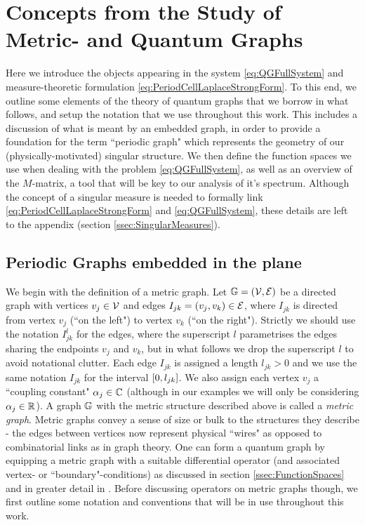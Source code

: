 \section{Concepts from the Study of Metric- and Quantum Graphs} \label{sec:QuantumGraphs}
Here we introduce the objects appearing in the system \eqref{eq:QGFullSystem} and measure-theoretic formulation \eqref{eq:PeriodCellLaplaceStrongForm}.
To this end, we outline some elements of the theory of quantum graphs that we borrow in what follows, and setup the notation that we use throughout this work.
This includes a discussion of what is meant by an embedded graph, in order to provide a foundation for the term ``periodic graph" which represents the geometry of our (physically-motivated) singular structure.
We then define the function spaces we use when dealing with the problem \eqref{eq:QGFullSystem}, as well as an overview of the $M$-matrix, a tool that will be key to our analysis of it's spectrum.
Although the concept of a singular measure is needed to formally link \eqref{eq:PeriodCellLaplaceStrongForm} and \eqref{eq:QGFullSystem}, these details are left to the appendix (section \ref{ssec:SingularMeasures}).

\subsection{Periodic Graphs embedded in the plane} \label{ssec:EmbeddedGraphs}
We begin with the definition of a metric graph.
Let $\mathbb{G}=\left( \mathcal{V},\mathcal{E} \right)$ be a directed graph with vertices $v_j\in \mathcal{V}$ and edges $I_{jk}=\left( v_j, v_k \right)\in \mathcal{E}$, where $I_{jk}$ is directed from vertex $v_j$ (``on the left") to vertex $v_k$ (``on the right").
Strictly we should use the notation $I_{jk}^l$ for the edges, where the superscript $l$ parametrises the edges sharing the endpoints $v_j$ and $v_k$, but in what follows we drop the superscript $l$ to avoid notational clutter.
Each edge $I_{jk}$ is assigned a length $l_{jk}>0$ and we use the same notation $I_{jk}$ for the interval $\left[ 0,l_{jk} \right]$.
We also assign each vertex $v_j$ a ``coupling constant" $\alpha_j\in\mathbb{C}$ (although in our examples we will only be considering $\alpha_j\in\mathbb{R}$).
A graph $\mathbb{G}$ with the metric structure described above is called a \emph{metric graph}.
Metric graphs convey a sense of size or bulk to the structures they describe - the edges between vertices now represent physical ``wires" as opposed to combinatorial links as in graph theory.
One can form a quantum graph by equipping a metric graph with a suitable differential operator (and associated vertex- or ``boundary"-conditions) as discussed in section \ref{ssec:FunctionSpaces} and in greater detail in \cite{berkolaiko2013introduction}.
Before discussing operators on metric graphs though, we first outline some notation and conventions that will be in use throughout this work. \newline


